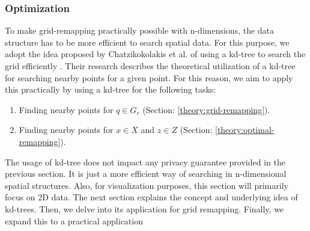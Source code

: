 \subsubsection{Optimization}
To make grid-remapping practically possible with n-dimensions, the data structure has to be more efficient to search spatial data. For this purpose, we adopt the idea proposed by Chatzikokolakis et al. of using a kd-tree to search the grid efficiently \citep{chatzikokolakis_efficient_2017}.
Their research describes the theoretical utilization of a kd-tree for searching nearby points for a given point.
For this reason, we aim to apply this practically by using a kd-tree for the following tasks:
\begin{enumerate}
  \item Finding nearby points for $q \in G_c$ (Section: \ref{theory:grid-remapping}).
  \item Finding nearby points for $x \in X$ and $z \in Z$ (Section: \ref{theory:optimal-remapping}).
\end{enumerate}
The usage of kd-tree does not impact any privacy guarantee provided in the previous section. It is just a more efficient way of searching in n-dimensional spatial structures. Also, for visualization purposes, this section will primarily focus on 2D data. \newline
The next section explains the concept and underlying idea of kd-trees.
Then, we delve into its application for grid remapping.
Finally, we expand this to a practical application
\newpage
